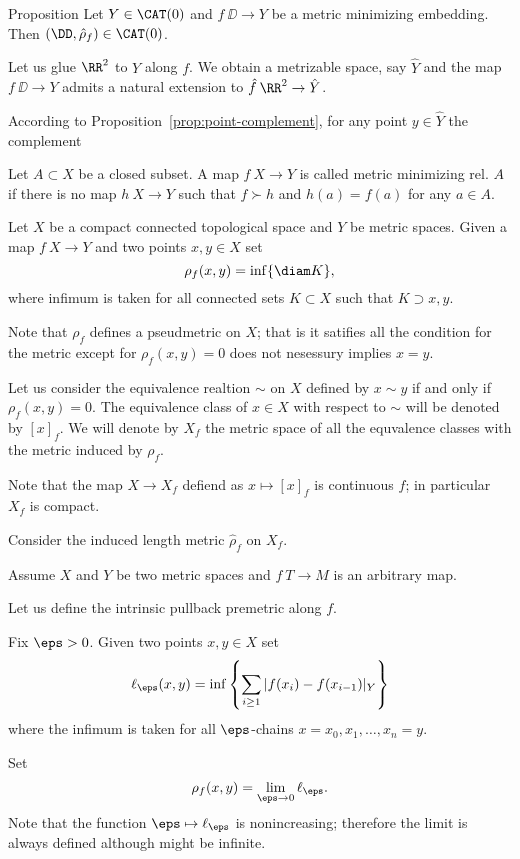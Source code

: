 \begin{thm}{Proposition}
Let $Y\in\CAT(0)$ 
and 
$f\:\DD\to Y$ be a metric minimizing embedding.
Then $(\DD,\hat\rho_f)\in \CAT(0)$.
\end{thm}



Let us glue $\RR^2$ to $Y$ along $f$.
We obtain a metrizable space, say $\hat Y$
and the map $f\:\DD\to Y$ admits a natural extension to $\hat f\:\RR^2\to \hat Y$.

According to Proposition~\ref{prop:point-complement}, for any point $y\in \hat Y$ the complement 








Let $A\subset X$ be a closed subset.
A map $f\:X\to Y$ is called metric minimizing rel. $A$
if there is no map $h\:X\to Y$ such that $f\succ h$ and $h(a)=f(a)$ for any $a\in A$.


Let $X$ be a compact connected topological space
and $Y$ be metric spaces.
Given a map $f\:X\to Y$ and two points $x,y\in X$
set 
\[\rho_f(x,y)=\inf\{\diam K\},\]
where infimum is taken for all connected sets $K\subset X$
such that $K\supset x,y$.

Note that $\rho_f$ defines a pseudmetric on $X$;
that is it satifies all the condition for the metric except for $\rho_f(x,y)=0$ does not nesessury implies $x=y$.


Let us consider the equivalence realtion $\sim$ on $X$ 
defined by
$x\sim y$ if and only if $\rho_f(x,y)=0$.
The equivalence class of $x\in X$ with respect to $\sim$
will be denoted by $[x]_f$.
We will denote by $X_f$ 
the metric space of all the equvalence classes with the metric induced by $\rho_f$.

Note that the map $X\to X_f$ defiend as $x\mapsto [x]_f$
is continuous $f$;
in particular $X_f$ is compact.

Consider the induced length metric $\hat\rho_f$ on $X_f$.


Assume $X$ and $Y$ be two metric spaces 
and $f\:T\to M$ is an arbitrary map.

Let us define the intrinsic pullback premetric along $f$.

Fix $\eps>0$.
Given two points $x,y\in X$
set 
\[\ell_\eps(x,y)=\inf\left\{\sum_{i\ge 1}|f(x_i)-f(x_{i-1})|_Y\right\}\]
where the infimum is taken for all $\eps$-chains
$x=x_0,x_1,\dots,x_n=y$.

Set
\[\rho_f(x,y)=\lim_{\eps\to0}\ell_\eps.\]
Note that the function $\eps\mapsto\ell_\eps$ is nonincreasing;
therefore the limit is always defined although might be infinite.

